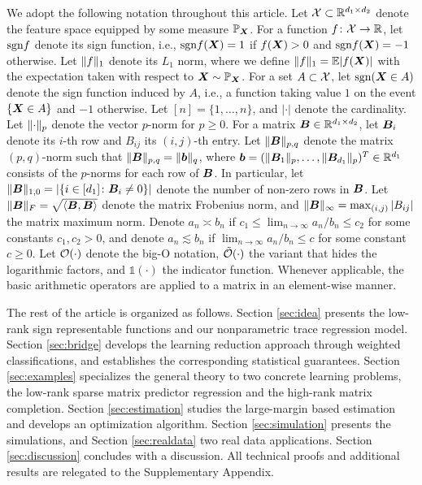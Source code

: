 \documentclass[11pt]{article}
\theoremstyle{plain}
\theoremstyle{definition}
\def\sign{\textup{sgn}}
\begin{document}
We adopt the following notation throughout this article. Let $\mathcal{X} \subset \mathbb{R}^{d_1\times d_2}$ denote the feature space equipped by some measure $\mathbb{P}_{\bm X}$. For a function $f\colon \mathcal{X} \to \mathbb{R}$, let $\sign f$ denote its sign function, i.e., $\sign f(\mX)=1$ if $f(\bm X)>0$ and $\sign f(\mX)=-1$ otherwise. Let $\lVert f\rVert_1$ denote its $L_1$ norm, where we define $\lVert f\rVert_1=\mathbb{E}|f(\bm X)|$ with the expectation taken with respect to $\bm X \sim \mathbb{P}_{\bm X}$. For a set $A \subset \mathcal{X}$, let $\sign (\mX\in A)$ denote the sign function induced by $A$, i.e., a function taking value $1$ on the event $\{\bm X\in A\}$ and $-1$ otherwise. Let $[n] = \{1,\ldots,n\}$, and $|\cdot|$ denote the cardinality. Let $\lVert\cdot\rVert_p$ denote the vector $p$-norm for $p\geq 0$. For a matrix $\bm B \in \mathbb{R}^{d_1\times d_2}$, let $\bm B_i$ denote its $i$-th row and $B_{ij}$ its $(i,j)$-th entry. Let $\lVert\bm B\rVert_{p,q}$ denote the matrix $(p,q)$-norm such that $\lVert\bm B\rVert_{p,q}=\lVert\bm{b}\rVert_q$, where $\bm{b}=(\lVert\bm B_1\rVert_p,\ldots,\lVert\bm B_{d_1}\rVert_p)^T\in\mathbb{R}^{d_1}$ consists of the $p$-norms for each row of $\bm B$. In particular, let $\lVert\bm B\rVert_{1,0}=|\{i\in [d_1]\colon \bm B_i\neq 0\}|$ denote the number of non-zero rows in $\bm B$. Let $\lVert\bm B\rVert_F=\sqrt{\langle \bm B, \bm B \rangle}$ denote the matrix Frobenius norm, and $\lVert\bm B\rVert_\infty=\max_{(i,j)}|B_{ij}|$ the matrix maximum norm. Denote $a_n\asymp b_n$ if $c_1\leq \lim_{n\to \infty} a_n/b_n\leq c_2$ for some constants $c_1,c_2>0$, and denote $a_n\lesssim b_n$ if $\lim_{n\to\infty} a_n/b_n\leq c$ for some constant $c\geq 0$. Let $\mathcal{O}(\cdot)$ denote the big-O notation, $\tilde {\mathcal{O}}(\cdot)$ the variant that hides the logarithmic factors, and $\mathds{1}(\cdot)$ the indicator function. Whenever applicable, the basic arithmetic operators are applied to a matrix in an element-wise manner. 

The rest of the article is organized as follows. Section \ref{sec:idea} presents the low-rank sign representable functions and our nonparametric trace regression model. Section \ref{sec:bridge} develops the learning reduction approach through weighted classifications, and establishes the corresponding statistical guarantees. Section \ref{sec:examples} specializes the general theory to two concrete learning problems, the low-rank sparse matrix predictor regression and the high-rank matrix completion. Section \ref{sec:estimation} studies the large-margin based estimation and develops an optimization algorithm. Section \ref{sec:simulation} presents the simulations, and Section \ref{sec:realdata} two real data applications. Section \ref{sec:discussion} concludes with a discussion. All technical proofs and additional results are relegated to the Supplementary Appendix. 
\end{document}
